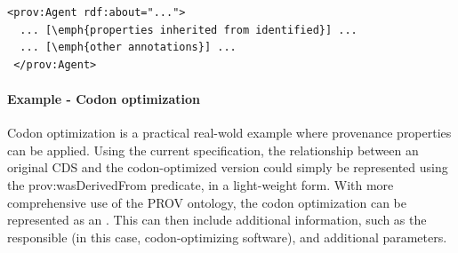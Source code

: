 \begin{lstlisting}
<prov:Agent rdf:about="...">
  ... [\emph{properties inherited from identified}] ...
  ... [\emph{other annotations}] ...
 </prov:Agent>
\end{lstlisting}


\paragraph{Example - Codon optimization}

 Codon optimization is a practical real-wold example where provenance properties can be applied. Using the current specification, the relationship between an original CDS and the codon-optimized version could simply be represented using the prov:wasDerivedFrom predicate, in a light-weight form. With more comprehensive use of the PROV ontology, the codon optimization can be represented as an . This  can then include additional information, such as the  responsible (in this case, codon-optimizing software), and additional parameters.



